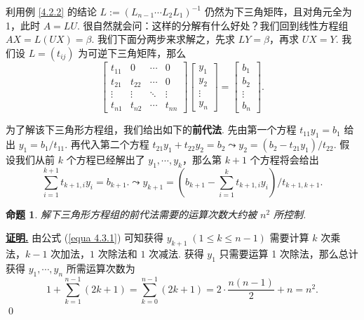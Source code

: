 \documentclass[10pt,openany]{article}
\theoremstyle{thmstyle} %
\theoremstyle{defstyle} %
\theoremstyle{prostyle} %
\newtheorem{proposition}[theorem]{命题}
\theoremstyle{exastyle}
\theoremstyle{remstyle}
\renewenvironment{proof}[1][证明]{\par\underline{\textbf{#1.}} \;\fangsong}{\qed\par}
\begin{document}
利用例 \ref{4.2.2} 的结论 \( L:=(L_{n-1} \cdots L_2 L_1)^{-1} \) 仍然为下三角矩阵，且对角元全为 1，此时 \( A=LU \). 很自然就会问：这样的分解有什么好处？我们回到线性方程组 \( AX=L(UX)=\beta \). 我们下面分两步来求解之，先求 \( LY=\beta \)，再求 \( UX=Y \). 我们设 \( L=(t_{ij}) \) 为可逆下三角矩阵，那么
\[ \begin{bmatrix}
	t_{11} & 0 & \cdots & 0 \\
	t_{21} & t_{22} & \cdots & 0 \\
	\vdots & \vdots & \ddots & \vdots \\
	t_{n1} & t_{n2} & \cdots & t_{nn}
\end{bmatrix}\begin{bmatrix}
    y_1 \\ y_2 \\ \vdots \\ y_n
\end{bmatrix}=\begin{bmatrix}
   b_1 \\ b_2 \\ \vdots \\ b_n
\end{bmatrix}. \]

为了解该下三角形方程组，我们给出如下的\textbf{前代法}. 先由第一个方程 \( t_{11} y_1=b_1 \) 给出 \( y_1=b_1/t_{11} \). 再代入第二个方程 \( t_{21}y_1+t_{22}y_2=b_2 \leadsto y_2=(b_2- t_{21}y_1)/t_{22} \). 假设我们从前 \( k \) 个方程已经解出了 \( y_1,\cdots,y_k \)，那么第 \( k+1 \) 个方程将会给出
\begin{equation}
	\sum_{i=1}^{k+1} t_{k+1,i}y_{i}=b_{k+1}. \leadsto y_{k+1}=\left(b_{k+1}-\sum_{i=1}^{k} t_{k+1,i}y_{i}\right)/t_{k+1,k+1}. 
	\label{equa 4.3.1}
\end{equation}

\begin{proposition}
	解下三角形方程组的前代法需要的运算次数大约被 \( n^2 \) 所控制.
\end{proposition}

\begin{proof}
	由公式 (\ref{equa 4.3.1}) 可知获得 \( y_{k+1} \; (1 \leq k \leq n-1)\) 需要计算 \( k \) 次乘法，\( k-1 \) 次加法，\( 1 \) 次除法和 \( 1 \) 次减法. 获得 \( y_1 \) 只需要运算 1 次除法，那么总计获得 \( y_1,\cdots,y_n \) 所需运算次数为
	\[ 1+\sum_{k=1}^{n-1} (2k+1)= \sum_{k=0}^{n-1} (2k+1)= 2 \cdot \frac{n(n-1)}{2}+n=n^2. \]
\end{proof}
\end{document}
